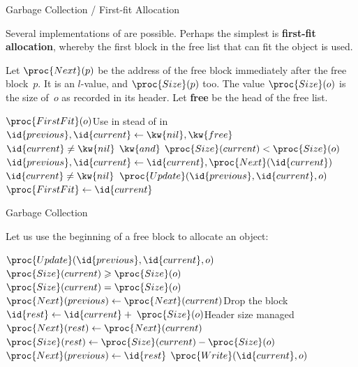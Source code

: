 \documentclass[compress,dvipdfmx]{beamer}
\begin{document}
%
\begin{frame}{Garbage Collection / First-fit Allocation}

  Several implementations of  are possible. Perhaps the
  simplest is \textbf{first-fit allocation}, whereby the first block
  in the free list that can fit the object is used.

  \bigskip

  Let \(\proc{Next}(p)\) be the address of the free block immediately
  after the free block~\(p\). It is an \(l\)\hyp{}value, and
  \(\proc{Size}(p)\) too. The value \(\proc{Size}(o)\) is the size
  of~\(o\) as recorded in its header. Let \textbf{free} be the head of
  the free list.
  \begin{codebox}
    \(\proc{FirstFit}(o)\)\RComment Use in stead of  in
    \\
    \li \(\id{previous}, \id{current} \gets \kw{nil}, \kw{free}\)
    \li \While \(\id{current} \neq \kw{nil}
               \,\; \kw{and} \,\; \proc{Size}(current) <
               \proc{Size}(o)\) 
    \li \> \(\id{previous}, \id{current}
    \gets \id{current}, \proc{Next}(\id{current})\)
    \End
    \li {} \(\id{current} \neq \kw{nil}\)  \(\proc{Update}(\id{previous},
    \id{current}, o)\)
    \li \(\proc{FirstFit} \gets \id{current}\)
  \end{codebox}

\end{frame}

%
\begin{frame}{Garbage Collection}

  Let us use the beginning of a free block to allocate an object:
  \begin{codebox}
    \(\proc{Update}(\id{previous}, \id{current}, o)\)\RComment
    \(\proc{Size}(current) \geqslant \proc{Size}(o)\)\\
    \li \If \(\proc{Size}(current) = \proc{Size}(o)\)
    \li \Then \(\proc{Next}(previous) \gets
    \proc{Next}(current)\)\RComment Drop the block
    \li \Else \(\id{rest} \gets \id{current} + \;
    \proc{Size}(o)\)\RComment Header size managed
    \li       \(\proc{Next}(rest) \gets \proc{Next}(current)\)
    \li       \(\proc{Size}(rest) \gets \proc{Size}(current) - \proc{Size}(o)\)
    \li       \(\proc{Next}(previous) \gets \id{rest}\)
        \End
    \li \(\proc{Write}(\id{current}, o)\)
  \end{codebox}

\end{frame}
\end{document}
